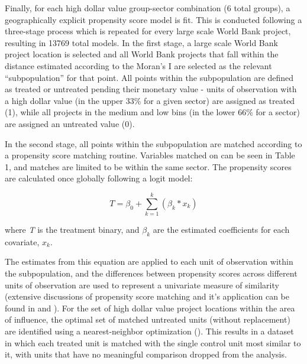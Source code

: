 \documentclass{article}\usepackage[]{graphicx}\usepackage[]{color}
\newenvironment{knitrout}{}{}  %
\begin{document}
\begin{knitrout}
\par

Finally, for each high dollar value group-sector combination (6 total groups), a geographically explicit propensity score model is fit.  
This is conducted following a three-stage process which is repeated for every large scale World Bank project, resulting in 13769 total models.
In the first stage, a large scale World Bank project location is selected and all World Bank projects that fall within the distance estimated according to the Moran's I are selected as the relevant ``subpopulation'' for that point.
All points within the subpopulation are defined as treated or untreated pending their monetary value - units of observation with a high dollar value (in the upper 33\% for a given sector) are assigned as treated (1), while all projects in the medium and low bins (in the lower 66\% for a sector) are assigned an untreated value (0).

\par
In the second stage, all points within the subpopulation are matched according to a propensity score matching routine.  
Variables matched on can be seen in Table 1, and matches are limited to be within the same sector. 
The propensity scores are calculated once globally following a logit model:

\begin{equation}
T = \beta_{0} + \sum_{k=1}^{k}(\beta_{k}*x_{k})
\label{EQpropensity}
\end{equation}

where \textit{T} is the treatment binary, and \begin{math}\beta_{k}\end{math} are the estimated coefficients for each covariate, \begin{math}x_{k}\end{math}.  

The estimates from this equation are applied to each unit of observation within the subpopulation, and the differences between propensity scores across different units of observation are used to represent a univariate measure of similarity (extensive discussions of propensity score matching and it's application can be found in \cite{rubin_estimating_1997} and \cite{abbay_does_2015}).  
For the set of high dollar value project locations within the area of influence, the optimal set of matched untreated units (without replacement) are identified using a nearest-neighbor optimization (\cite{ho_matchit:_2011}). 
This results in a dataset in which each treated unit is matched with the single control unit most similar to it, with units that have no meaningful comparison dropped from the analysis.
\par


\end{knitrout}
\end{document}
